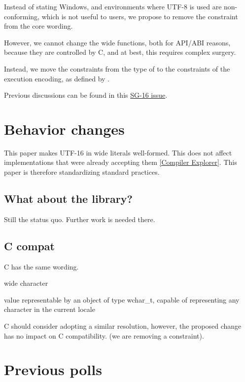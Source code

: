 \documentclass{wg21}
\begin{document}
Instead of stating Windows, and environments where UTF-8 is used are non-conforming, which is not useful to users, we propose to remove the constraint
from the core wording.

However, we cannot change the wide functions, both for API/ABI reasons, because they are controlled by C,
and at best, this requires complex surgery.

Instead, we move the constraints from the type of  to the constraints of the execution encoding,
as defined by .

Previous discussions can be found in this \href{https://github.com/sg16-unicode/sg16/issues/9}{SG-16 issue}.

\section{Behavior changes}

This paper makes UTF-16 in wide literals well-formed. This does not affect implementations that were already accepting them \href{https://godbolt.org/z/cPe69bshM}{[Compiler Explorer]}.
This paper is therefore standardizing standard practices.

\subsection{What about the library?}

Still the status quo. Further work is needed there.

\subsection{C compat}

C has the same wording.

\begin{quoteblock}
wide character

value representable by an object of type wchar_t, capable of representing any character in the current locale
\end{quoteblock}

C should consider adopting a similar resolution, however, the proposed change has no impact on C compatibility.
(we are removing a constraint).


\section{Previous polls}
\end{document}
